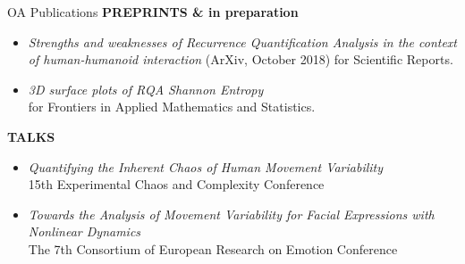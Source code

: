 {{\begin{frame}{OA Publications}
\textbf{PREPRINTS \& in preparation}
\begin{itemize}	
	\item \textit{Strengths and weaknesses of Recurrence Quantification Analysis in the context of human-humanoid interaction}
	(ArXiv, October 2018) for Scientific Reports.
	\item \textit{3D surface plots of RQA Shannon Entropy} \\
 	for Frontiers in Applied Mathematics and Statistics.
\end{itemize}

\textbf{TALKS}
\begin{itemize}	
	\item \textit{Quantifying the Inherent Chaos of Human Movement Variability} \\
	15th Experimental Chaos and Complexity Conference 
	\item \textit{Towards the Analysis of Movement Variability for Facial Expressions with
	Nonlinear Dynamics} \\
	The 7th Consortium of European Research on Emotion Conference 
\end{itemize}

	
\end{frame}
}


}
